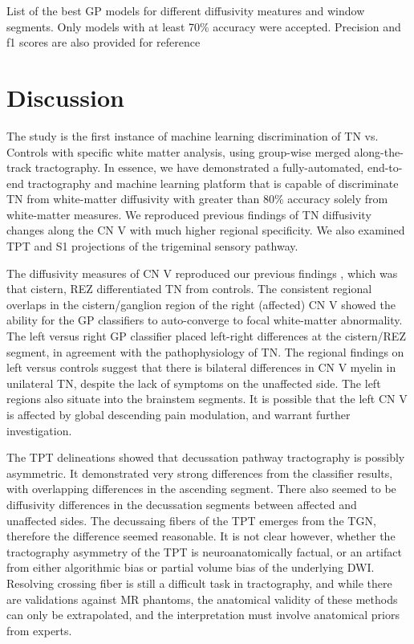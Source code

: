 \begin{table}[ht]
\centering
{}
\caption{List of the best GP models for different diffusivity meatures and window segments. Only models with at least 70\% accuracy were accepted. Precision and f1 scores are also provided for reference}
\label{table:GP}
\end{table}

\section{Discussion}
The study is the first instance of machine learning discrimination of TN vs. Controls with specific white matter analysis, using group-wise merged along-the-track tractography. In essence, we have demonstrated a fully-automated, end-to-end tractography and machine learning platform that is capable of discriminate TN from white-matter diffusivity with greater than 80\% accuracy solely from white-matter measures. We reproduced previous findings of TN diffusivity changes along the CN V with much higher regional specificity. We also examined TPT and S1 projections of the trigeminal sensory pathway.

The diffusivity measures of CN V reproduced our previous findings \cite{Chen2016a}, which was that cistern, REZ differentiated TN from controls. The consistent regional overlaps in the cistern/ganglion region of the right (affected) CN V showed the ability for the GP classifiers to auto-converge to focal white-matter abnormality. The left versus right GP classifier placed left-right differences at the cistern/REZ segment, in agreement with the pathophysiology of TN. The regional findings on left versus controls suggest that there is bilateral differences in CN V myelin in unilateral TN, despite the lack of symptoms on the unaffected side. The left regions also situate into the brainstem segments. It is possible that the left CN V is affected by global descending pain modulation, and warrant further investigation. 

The TPT delineations showed that decussation pathway tractography is possibly asymmetric. It demonstrated very strong differences from the classifier results, with overlapping differences in the ascending segment. There also seemed to be diffusivity differences in the decussation segments between affected and unaffected sides. The decussaing fibers of the TPT emerges from the TGN, therefore the difference seemed reasonable. It is not clear however, whether the tractography asymmetry of the TPT is neuroanatomically factual, or an artifact from either algorithmic bias or partial volume bias of the underlying DWI. Resolving crossing fiber is still a difficult task in tractography, and while there are validations against MR phantoms, the anatomical validity of these methods can only be extrapolated, and the interpretation must involve anatomical priors from experts.  

